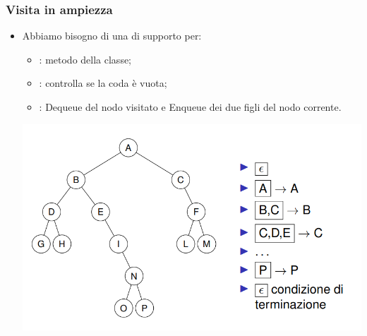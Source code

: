 \subsubsection{Visita in ampiezza}
\begin{itemize}
    \item Abbiamo bisogno di una \textcolor{blue}{} di supporto per:
    \begin{itemize}
        \item \textbf{\textcolor{blue}{}}: metodo della classe;
        \item \textbf{\textcolor{blue}{}}: controlla se la coda è vuota;
        \item \textbf{\textcolor{blue}{}}: Dequeue del nodo visitato e Enqueue dei due figli del nodo corrente.
    \end{itemize}
    \begin{center}
        \includegraphics[scale = 0.5]{Capitoli/Iteratori/Esempi/Visita in ampiezza.png}
    \end{center}
\end{itemize}

